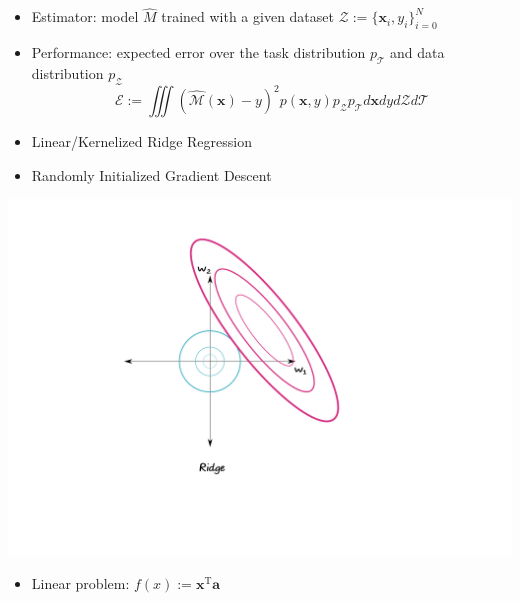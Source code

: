 \documentclass[a0paper,portrait]{baposter}
\begin{document}
\begin{poster}
{\begin{itemize}
  \begin{center}
  \texttt{[image: lin\_maml.pdf]}%
  \texttt{[image: nonlin\_maml.pdf]}
  \end{center}
\color{Pink} \item \color{Black} Estimator: model $\hat{M}$ trained  with a given dataset $\mathcal{Z}:=\{\mathbf{x}_i, y_i\}_{i=0}^{N}$
  \color{Pink} \item \color{Black} Performance: expected error over the task distribution $p_\mathcal{T}$ and data distribution $p_\mathcal{Z}$
  \begin{equation}\label{eq:ee}
    \mathcal{E}:= \iiint(\mathcal{\hat{M}}(\mathbf{x}) - y)^2 p(\mathbf{x}, y)p_{\mathcal{Z}} p_{\mathcal{T}} d\mathbf{x} dy d\mathcal{Z} d\mathcal{T}
  \end{equation}
  \end{itemize}
  
}

{
  \begin{itemize}
    \color{Pink} \item \color{Black} Linear/Kernelized Ridge Regression
    \color{Pink} \item \color{Black} Randomly Initialized Gradient Descent
  \end{itemize}
  \begin{center}
  \includegraphics[width=1.2\textwidth]{figures/ridge}
  \end{center}
}

{
  \begin{itemize}
    \color{Pink} \item \color{Black} Linear problem: $f(x):=\mathbf{x}^\text{T}\mathbf{a}$


\end{itemize}}
\end{poster}
\end{document}
